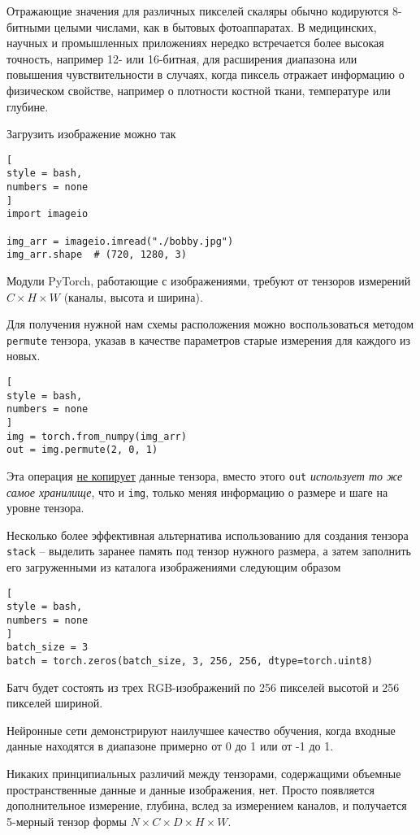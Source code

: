 \documentclass[%
	11pt,
	a4paper,
	utf8,
		]{article}
\begin{document}
Отражающие значения для различных пикселей скаляры обычно кодируются 8-битными целыми числами, как в бытовых фотоаппаратах. В медицинских, научных и промышленных приложениях нередко встречается более высокая точность, например 12- или 16-битная, для расширения диапазона или повышения чувствительности в случаях, когда пиксель отражает информацию о физическом свойстве, например о плотности костной ткани, температуре или глубине.

Загрузить изображение можно так
\begin{lstlisting}[
style = bash,
numbers = none	
]
import imageio

img_arr = imageio.imread("./bobby.jpg")
img_arr.shape  # (720, 1280, 3)
\end{lstlisting}

Модули PyTorch, работающие с изображениями, требуют от тензоров измерений $C \times H \times W$ (каналы, высота и ширина).

Для получения нужной нам схемы расположения можно воспользоваться методом \verb|permute| тензора, указав в качестве параметров старые измерения для каждого из новых.
\begin{lstlisting}[
style = bash,
numbers = none	
]
img = torch.from_numpy(img_arr)
out = img.permute(2, 0, 1)
\end{lstlisting}

Эта операция \underline{не копирует} данные тензора, вместо этого \verb|out| \emph{использует то же самое хранилище}, что и \verb|img|, только меняя информацию о размере и шаге на уровне тензора.

Несколько более эффективная альтернатива использованию для создания тензора \verb|stack| -- выделить заранее память под тензор нужного размера, а затем заполнить его загруженными из каталога изображениями следующим образом
\begin{lstlisting}[
style = bash,
numbers = none
]
batch_size = 3
batch = torch.zeros(batch_size, 3, 256, 256, dtype=torch.uint8)
\end{lstlisting}

Батч будет состоять из трех RGB-изображений по 256 пикселей высотой и 256 пикселей шириной. 

Нейронные сети демонстрируют наилучшее качество обучения, когда входные данные находятся в диапазоне примерно от 0 до 1 или от -1 до 1.

Никаких принципиальных различий между тензорами, содержащими объемные пространственные данные и данные изображения, нет. Просто появляется дополнительное измерение, глубина, вслед за измерением каналов, и получается 5-мерный тензор формы $N \times C \times D \times H \times W$.
\end{document}
